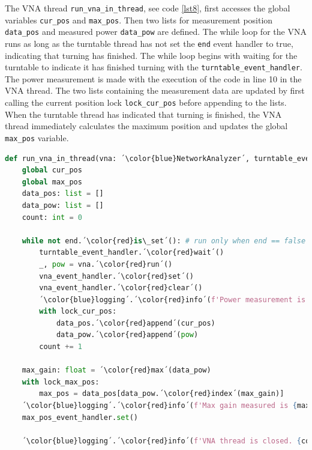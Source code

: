 The VNA thread \verb+run_vna_in_thread+, see code \ref{lst8}, first accesses the global variables \verb+cur_pos+ and \verb+max_pos+. Then two lists for measurement position \verb+data_pos+ and measured power \verb+data_pow+ are defined. The while loop for the VNA runs as long as the turntable thread has not set the \verb+end+ event handler to true, indicating that turning has finished. The while loop begins with waiting for the turntable to indicate it has finished turning with the \verb+turntable_event_handler+. The power measurement is made with the execution of the code in line 10 in the VNA thread. The two lists containing the measurement data are updated by first calling the current position lock \verb+lock_cur_pos+ before appending to the lists. When the turntable thread has indicated that turning is finished, the VNA thread immediately calculates the maximum position and updates the global \verb+max_pos+ variable.

\begin{lstlisting}[language=Python, caption=Thread function for running VNA.]
def run_vna_in_thread(vna: ´\color{blue}NetworkAnalyzer´, turntable_event_handler: ´\color{blue}Event´, vna_event_handler: ´\color{blue}Event´, end: ´\color{blue}Event´) -> None:
    global cur_pos 
    global max_pos
    data_pos: list = []
    data_pow: list = []
    count: int = 0 

    while not end.´\color{red}is\_set´(): # run only when end == false
        turntable_event_handler.´\color{red}wait´() 
        _, pow = vna.´\color{red}run´()
        vna_event_handler.´\color{red}set´() 
        vna_event_handler.´\color{red}clear´()
        ´\color{blue}logging´.´\color{red}info´(f'Power measurement is {pow}.')
        with lock_cur_pos: 
            data_pos.´\color{red}append´(cur_pos)
            data_pow.´\color{red}append´(pow)
        count += 1

    max_gain: float = ´\color{red}max´(data_pow)
    with lock_max_pos:
        max_pos = data_pos[data_pow.´\color{red}index´(max_gain)]
    ´\color{blue}logging´.´\color{red}info´(f'Max gain measured is {max_gain} at position {max_pos}.')
    max_pos_event_handler.set() 

    ´\color{blue}logging´.´\color{red}info´(f'VNA thread is closed. {count} measurements made.')
\end{lstlisting} \label{lst8}

